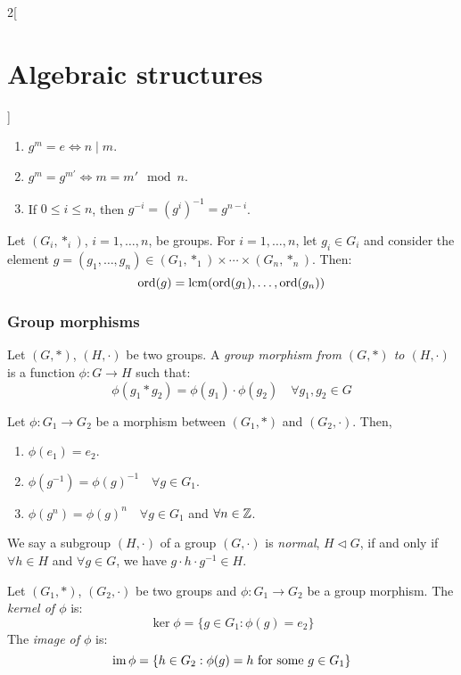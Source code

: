 \documentclass[../../../main.tex]{subfiles}
\begin{document}
\begin{multicols}{2}[\section{Algebraic structures}]
\begin{lemma}
    \begin{enumerate}
        \item $g^m=e\iff n\mid m$.
        \item $g^m=g^{m'}\iff m=m'\mod{n}$.
        \item If $0\leq i\leq n$, then $g^{-i}=(g^i)^{-1}=g^{n-i}$.
    \end{enumerate}
\end{lemma}
\begin{corollary}
    Let $(G_i,*_i)$, $i=1,\ldots, n$, be groups. For $i=1,\ldots,n$, let $g_i\in G_i$ and consider the element $g=(g_1,\ldots,g_n)\in(G_1,*_1)\times\cdots\times(G_n,*_n)$. Then: $$\text{ord}(g)=\operatorname{lcm}(\text{ord}(g_1),\ldots,\text{ord}(g_n))$$
\end{corollary}
\subsubsection{Group morphisms}
\begin{definition}\label{AS-groupmorphism}
    Let $(G,*)$, $(H,\cdot)$ be two groups. A \textit{group morphism from $(G,*)$ to $(H,\cdot)$} is a function $\phi:G\rightarrow H$ such that: $$\phi(g_1*g_2)=\phi(g_1)\cdot\phi(g_2)\quad\forall g_1,g_2\in G$$
\end{definition}
\begin{lemma}
    Let $\phi:G_1\rightarrow G_2$ be a morphism between $(G_1,*)$ and $(G_2,\cdot)$. Then,
    \begin{enumerate}
        \item $\phi(e_1)=e_2$.
        \item $\phi(g^{-1})=\phi(g)^{-1}\quad\forall g\in G_1$.
        \item $\phi(g^n)=\phi(g)^n\quad\forall g\in G_1$ and $\forall n\in\mathbb{Z} $.
    \end{enumerate}
\end{lemma}
\begin{definition}
    We say a subgroup $(H,\cdot)$ of a group $(G,\cdot)$ is \textit{normal}, $H\lhd G$, if and only if $\forall h\in H$ and $\forall g\in G$, we have $g\cdot h\cdot g^{-1}\in H$.
\end{definition}
\begin{definition}
    Let $(G_1,*)$, $(G_2,\cdot)$ be two groups and $\phi:G_1\rightarrow G_2$ be a group morphism. The \textit{kernel of $\phi$} is: $$\ker\phi=\{g\in G_1:\phi(g)=e_2\}$$ 
    The \textit{image of $\phi$} is: $$\operatorname{im}\phi=\{h\in G_2:\phi(g)=h\text{ for some }g\in G_1\}$$
\end{definition}

\end{multicols}
\end{document}

